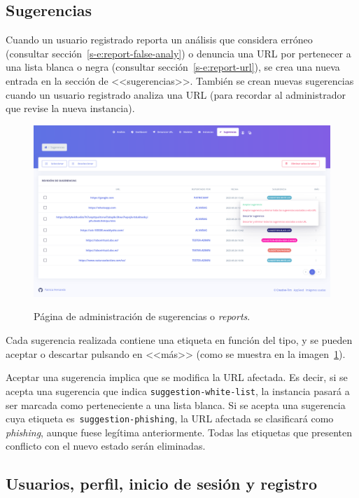 \subsection{Sugerencias}
\label{s-e:sugerencias}

Cuando un usuario registrado reporta un análisis que considera erróneo (consultar sección~\ref{s-e:report-false-analy}) o denuncia una URL por pertenecer a una lista blanca o negra (consultar sección~\ref{s-e:report-url}), se crea una nueva entrada en la sección de <<sugerencias>>. También se crean nuevas sugerencias cuando un usuario registrado analiza una URL (para recordar al administrador que revise la nueva instancia).

\begin{figure}[h]
	\caption[Manual de usuario: administrar sugerencias]{Página de administración de sugerencias o \textit{reports}.}
	\centering
	\includegraphics[width=\textwidth]{../img/anexos/user_guide/7_reports}
	\label{e-7:reports}
\end{figure}

Cada sugerencia realizada contiene una etiqueta en función del tipo, y se pueden aceptar o descartar pulsando en <<más>> (como se muestra en la imagen~\ref{e-7:reports}).

Aceptar una sugerencia implica que se modifica la URL afectada. Es decir, si se acepta una sugerencia que indica \texttt{suggestion-white-list}, la instancia pasará a ser marcada como perteneciente a una lista blanca. Si se acepta una sugerencia cuya etiqueta es~\texttt{suggestion-phishing}, la URL afectada se clasificará como \textit{phishing}, aunque fuese legítima anteriormente. Todas las etiquetas que presenten conflicto con el nuevo estado serán eliminadas.

\subsection{Usuarios, perfil, inicio de sesión y registro}

